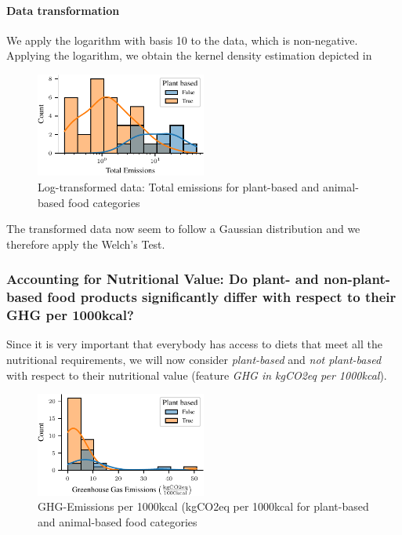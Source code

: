 \documentclass{article}
\begin{document}
\paragraph*{Data transformation}
We apply the logarithm with basis 10 to the data, which is non-negative. Applying the logarithm, we obtain the kernel density estimation depicted in  

\begin{figure}[h]
  \centering
  \includegraphics[width=0.5\textwidth]{figures/emissions-log.pdf}
  \caption{Log-transformed data: Total emissions for plant-based and animal-based food categories}
  \label{fig:emissions-log}
\end{figure}

The transformed data now seem to follow a  Gaussian distribution and we therefore apply the Welch's Test.

\subsubsection*{Accounting  for Nutritional Value: Do plant- and non-plant-based food products significantly differ with respect to their GHG per 1000kcal?}

Since it is very important that everybody has access to diets that meet all the nutritional requirements, we will now consider \textit{plant-based} and \textit{not plant-based} with respect to their nutritional value (feature \textit{GHG in kgCO2eq per 1000kcal}).



\begin{figure}[h]
  \centering
  \includegraphics[width=0.5\textwidth]{figures/ghg.pdf}
  \caption{GHG-Emissions per 1000kcal (kgCO2eq per 1000kcal for plant-based and animal-based food categories}
  \label{fig:ghg}
\end{figure}
\end{document}
